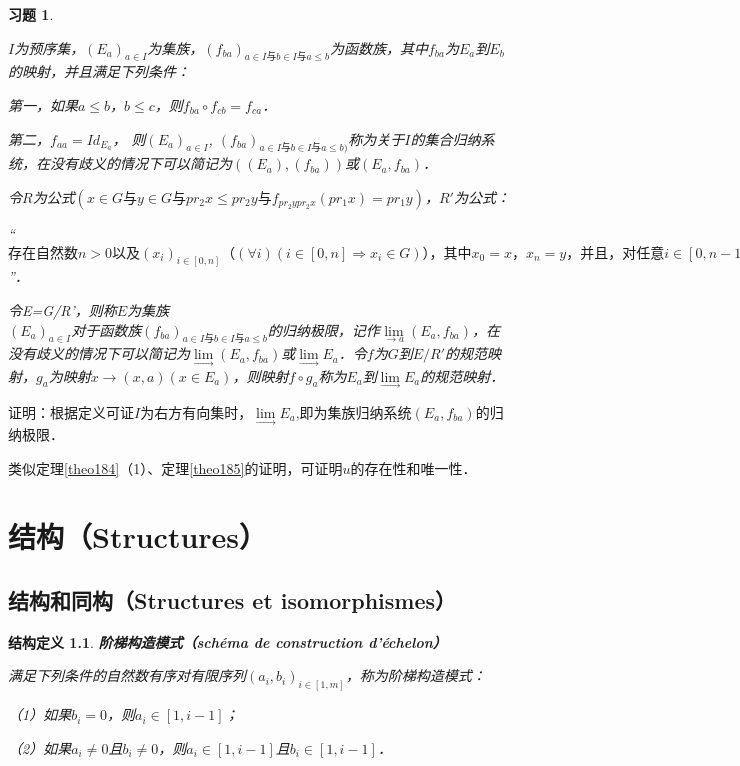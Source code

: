 \documentclass[12pt, a4paper, oneside]{book}
\newtheorem{STdef}{结构定义}
\newtheorem{exer}{习题}
\begin{document}
			\begin{exer}\label{exer197}
				\hfill\par
				$I$为预序集，$(E_a)_{a\in I}$为集族，$(f_{ba})_{a\in I\text{与}b\in I\text{与}a\leq b}$为函数族，其中$f_{ba}$为$E_a$到$E_b$的映射，并且满足下列条件：
				\par
				第一，如果$a\leq b$，$b\leq c$，则$f_{ba}\circ f_{cb}=f_{ca}$．
				\par
				第二，$f_{aa}=Id_{E_a}$，
				则$(E_a)_{a\in I}$, $(f_{ba})_{a\in I\text{与}b\in I\text{与}a\leq b)}$称为关于$I$的集合归纳系统，在没有歧义的情况下可以简记为$((E_a), (f_{ba}))$或$(E_a, f_{ba})$．
				\par
				令$R$为公式$(x\in G\text{与}y\in G\text{与}pr_2x\leq pr_2y\text{与}f_{pr_2y pr_2x}(pr_1x)=pr_1y)$，$R'$为公式：
				\par
				“$\text{存在自然数}n>0\text{以及}(x_i)_{i\in [0, n]}\text{（}(\forall i)(i\in [0, n]\Rightarrow x_i\in G)\text{），其中}x_0=x\text{，}x_n=y\text{，并且，}\text{对任意}i\in [0, n-1]\text{，}(x_{i+1}|y)(x_i|x)R\text{或}(x_i|y)(x_{i+1}|x)R\text{为真}$”．
				\par
				令E=G/R'，则称$E$为集族\\$(E_a)_{a\in I}$对于函数族$(f_{ba})_{a\in I\text{与}b\in I\text{与}a\leq b}$的归纳极限，记作$\lim\limits_{\to a}(E_a, f_{ba})$，在没有歧义的情况下可以简记为$\lim\limits_\to (E_a, f_{ba})$或$\lim\limits_\to E_a$．令$f$为$G$到$E/R'$的规范映射，$g_a$为映射$x\to (x, a)(x\in E_a)$，则映射$f\circ g_a$称为$E_a$到$\lim\limits_\to E_a$的规范映射．
			\end{exer}
			证明：根据定义可证$I$为右方有向集时，$\lim\limits_\to E_a$,即为集族归纳系统$(E_a, f_{ba})$的归纳极限．
			\par
			类似定理\ref{theo184}（1）、定理\ref{theo185}的证明，可证明$u$的存在性和唯一性．

	\chapter{结构（Structures）}
		\section{结构和同构（Structures et isomorphismes）}		
			\begin{STdef}
				\textbf{阶梯构造模式（schéma de construction d'échelon）}
				\par
				满足下列条件的自然数有序对有限序列$(a_i, b_i)_{i\in [1, m]}$，称为阶梯构造模式：
				\par
				（1）如果$b_i=0$，则$a_i\in [1, i-1]$； 
				\par
				（2）如果$a_i\neq 0$且$b_i\neq 0$，则$a_i\in [1, i-1]$且$b_i\in [1, i-1]$．
			\end{STdef}
\end{document}
